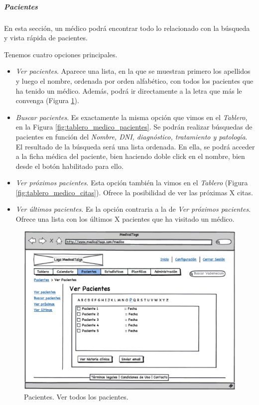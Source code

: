 		\smallskip
		\subparagraph{Pacientes} %
		\label{par:medico_pacientes}
		
		En esta sección, un médico podrá encontrar todo lo relacionado con la búsqueda y vista rápida de pacientes.
		
		Tenemos cuatro opciones principales.
		
		\begin{itemize}
			\item \textit{Ver pacientes}. Aparece una lista, en la que se muestran primero los apellidos y luego el nombre, ordenada por orden alfabético, con todos los pacientes que ha tenido un médico. Además, podrá ir directamente a la letra que más le convenga (Figura \ref{fig:pacientes_medico}).
			\item \textit{Buscar pacientes}. Es exactamente la misma opción que vimos en el \textit{Tablero}, en la Figura \ref{fig:tablero_medico_pacientes}. Se podrán realizar búsquedas de pacientes en función del \textit{Nombre, DNI, diagnóstico, tratamiento y patología}. El resultado de la búsqueda será una lista ordenada. En ella, se podrá acceder a la ficha médica del paciente, bien haciendo doble click en el nombre, bien desde el botón habilitado para ello.
			\item \textit{Ver próximos pacientes}. Esta opción también la vimos en el \textit{Tablero} (Figura \ref{fig:tablero_medico_citas}). Ofrece la posibilidad de ver las próximas X citas.
			\item \textit{Ver últimos pacientes}. Es la opción contraria a la de \textit{Ver próximos pacientes}. Ofrece una lista con los últimos X pacientes que ha visitado un médico. 
		\end{itemize}
			
		\begin{figure}[H]
		  \centering
		    \includegraphics[width=12cm]{img/eps/17_Pacientes_Medico.eps}
		  \caption{Pacientes. Ver todos los pacientes.}
		  \label{fig:pacientes_medico}
		\end{figure}
		
